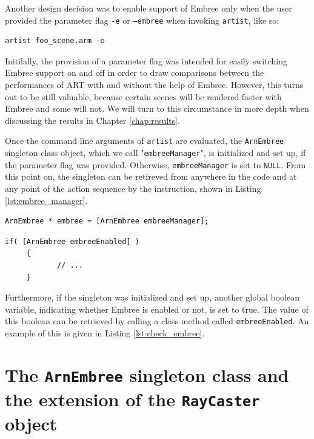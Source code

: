 Another design decision was to enable support of Embree only when the user provided the parameter flag \texttt{-e} or \texttt{--embree} when invoking \texttt{artist}, like so:

\begin{Verbatim}
artist foo_scene.arm -e
\end{Verbatim}

Initilally, the provision of a parameter flag was intended for easily switching Embree support on and off in order to draw comparisons between the performances of ART with and without the help of Embree. However, this turns out to be still valuable, because certain scenes will be rendered faster with Embree and some will not. We will turn to this circumstance in more depth when discussing the results in Chapter \ref{chap:results}. 

Once the command line arguments of \texttt{artist} are evaluated, the \texttt{ArnEmbree} singleton class object, which we call "\texttt{embreeManager}", is initialized and set up, if the parameter flag was provided. Otherwise, \texttt{embreeManager} is set to \texttt{NULL}. From this point on, the  singleton can be retireved from anywhere in the code and at any point of the action sequence by the instruction, shown in Listing \ref{lst:embree_manager}.

\begin{listing} 
	\begin{lstlisting}[caption={Retrieving the \texttt{ArnEmbree} singleton.}, label={lst:embree_manager}]
	ArnEmbree * embree = [ArnEmbree embreeManager];
	\end{lstlisting}
\end{listing}


\begin{listing}
	\begin{lstlisting}[caption={Verifying if the \texttt{ArnEmbree} singleton was initialized.}, label={lst:check_embree}]
	 if( [ArnEmbree embreeEnabled] ) 
	 {
	 		// ...
	 }
	\end{lstlisting}
\end{listing}

Furthermore, if the singleton was initialized and set up, another global boolean variable, indicating whether Embree is enabled or not, is set to true. The value of this boolean can be retrieved by calling a class method called \texttt{embreeEnabled}. An example of this is given in Listing \ref{lst:check_embree}.

\section{The \texttt{ArnEmbree} singleton class and the extension of the \texttt{RayCaster} object}

